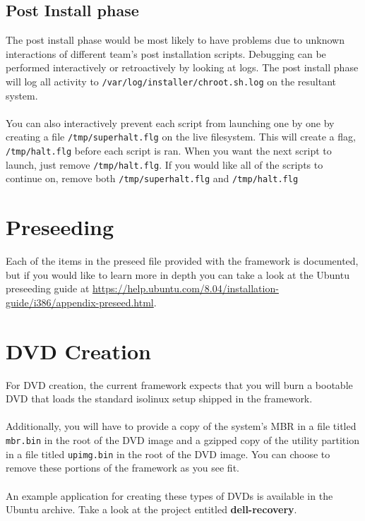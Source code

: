 \documentclass[letterpaper,10pt,titlepage]{article}
\begin{document}
\subsection{Post Install phase}
The post install phase would be most likely to have problems due to unknown interactions of different team's post installation scripts.
Debugging can be performed interactively or retroactively by looking at logs.  The post install phase will log all activity to \texttt{/var/log/installer/chroot.sh.log} on the resultant system.
\\
\\
You can also interactively prevent each script from launching one by one by creating a file \texttt{/tmp/superhalt.flg} on the live filesystem.  This will create a flag, \texttt{/tmp/halt.flg} before each script is ran.  When you want the next script to launch, just remove \texttt{/tmp/halt.flg}.  If you would like all of the scripts to continue on, remove both \texttt{/tmp/superhalt.flg} and \texttt{/tmp/halt.flg}

\section{Preseeding}
Each of the items in the preseed file provided with the framework is documented, but if you would like to learn more in depth you can take a look at the Ubuntu preseeding guide at \url{https://help.ubuntu.com/8.04/installation-guide/i386/appendix-preseed.html}.

\section{DVD Creation}
For DVD creation, the current framework expects that you will burn a bootable DVD that loads the standard isolinux setup shipped in the framework.
\\
\\
Additionally, you will have to provide a copy of  the system's MBR in a file titled \texttt{mbr.bin} in the root of the DVD image and a gzipped copy of the utility partition in a file titled \texttt{upimg.bin} in the root of the DVD image.  You can choose to remove these portions of the framework as you see fit.
\\
\\
An example application for creating these types of DVDs is available in the Ubuntu archive.  Take a look at the project entitled \textbf{dell-recovery}.


\end{document}
